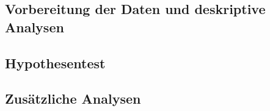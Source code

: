 \subsection{Vorbereitung der Daten und deskriptive Analysen}

\subsection{Hypothesentest} \label{sec:Hypothesentest}

\subsection{Zusätzliche Analysen} \label{sec:ZusätzlicheAnalysen}